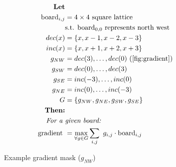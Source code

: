 \documentclass[journal]{IEEEtran}
\begin{document}
\begin{framed}
\begin{align*}
    \textbf{Let} \\
    \text{\ board}_{i,j} &= 4\times{}4 \text{\ square lattice} \\
                            &\text{s.t. } \text{board}_{0,0} \text{\ represents north west} \\
    dec(x) &= \left\{x, x-1, x-2, x-3\right\} \\
    inc(x) &= \left\{x, x+1, x+2, x+3\right\} \\
    g_{NW} &= {dec(3), \dots, dec(0)}~(\autoref{fig:gradient})\\
    g_{SW} &= {dec(0), \dots, dec(3)} \\
    g_{SE} &= {inc(-3), \dots, inc(0)} \\
    g_{NE} &= {inc(0), \dots, inc(-3)} \\
    G &= \left\{g_{NW}, g_{NE}, g_{SW}, g_{SE}\right\} \\
    \textbf{Then:} \\
    \textit{For a } & \textit{given board:} \\
    \text{gradient } &= \max\limits_{\forall{}g \in G}\sum\limits_{i,j}{{\ g_{i,j} \cdot \text{board}_{i,j}}}
\end{align*}
\end{framed}

\begin{figure}[Hb]
\centering
    \caption{Example gradient mask ($g_{NW}$)}
\label{fig:gradient}
\end{figure}
\end{document}
